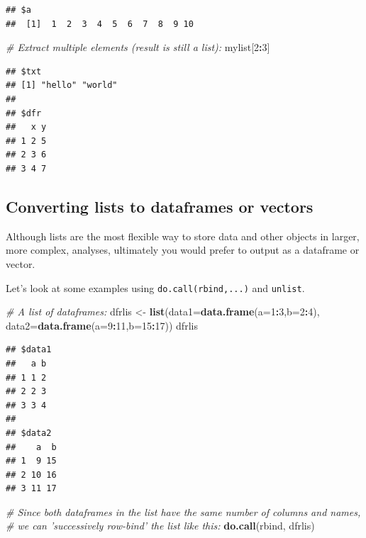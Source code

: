 \documentclass[]{book}
\newenvironment{Shaded}{\begin{snugshade}}{\end{snugshade}}
\newcommand{\CommentTok}[1]{\textcolor[rgb]{0.56,0.35,0.01}{\textit{#1}}}
\newcommand{\DataTypeTok}[1]{\textcolor[rgb]{0.13,0.29,0.53}{#1}}
\newcommand{\DecValTok}[1]{\textcolor[rgb]{0.00,0.00,0.81}{#1}}
\newcommand{\KeywordTok}[1]{\textcolor[rgb]{0.13,0.29,0.53}{\textbf{#1}}}
\newcommand{\NormalTok}[1]{#1}
\newcommand{\OperatorTok}[1]{\textcolor[rgb]{0.81,0.36,0.00}{\textbf{#1}}}
\newcommand{\StringTok}[1]{\textcolor[rgb]{0.31,0.60,0.02}{#1}}
\begin{document}
\begin{verbatim}
## $a
##  [1]  1  2  3  4  5  6  7  8  9 10
\end{verbatim}

\begin{Shaded}
\begin{Highlighting}[]
\CommentTok{# Extract multiple elements (result is still a list):}
\NormalTok{mylist[}\DecValTok{2}\OperatorTok{:}\DecValTok{3}\NormalTok{]}
\end{Highlighting}
\end{Shaded}

\begin{verbatim}
## $txt
## [1] "hello" "world"
## 
## $dfr
##   x y
## 1 2 5
## 2 3 6
## 3 4 7
\end{verbatim}

\hypertarget{converting-lists-to-dataframes-or-vectors}{%
\subsection{Converting lists to dataframes or vectors}\label{converting-lists-to-dataframes-or-vectors}}

Although lists are the most flexible way to store data and other objects in larger, more complex, analyses, ultimately you would prefer to output as a dataframe or vector.

Let's look at some examples using \texttt{do.call(rbind,...)} and \texttt{unlist}.

\begin{Shaded}
\begin{Highlighting}[]
\CommentTok{# A list of dataframes:}
\NormalTok{dfrlis <-}\StringTok{ }\KeywordTok{list}\NormalTok{(}\DataTypeTok{data1=}\KeywordTok{data.frame}\NormalTok{(}\DataTypeTok{a=}\DecValTok{1}\OperatorTok{:}\DecValTok{3}\NormalTok{,}\DataTypeTok{b=}\DecValTok{2}\OperatorTok{:}\DecValTok{4}\NormalTok{), }\DataTypeTok{data2=}\KeywordTok{data.frame}\NormalTok{(}\DataTypeTok{a=}\DecValTok{9}\OperatorTok{:}\DecValTok{11}\NormalTok{,}\DataTypeTok{b=}\DecValTok{15}\OperatorTok{:}\DecValTok{17}\NormalTok{))}
\NormalTok{dfrlis}
\end{Highlighting}
\end{Shaded}

\begin{verbatim}
## $data1
##   a b
## 1 1 2
## 2 2 3
## 3 3 4
## 
## $data2
##    a  b
## 1  9 15
## 2 10 16
## 3 11 17
\end{verbatim}

\begin{Shaded}
\begin{Highlighting}[]
\CommentTok{# Since both dataframes in the list have the same number of columns and names, }
\CommentTok{# we can 'successively row-bind' the list like this:}
\KeywordTok{do.call}\NormalTok{(rbind, dfrlis)}
\end{Highlighting}
\end{Shaded}
\end{document}
